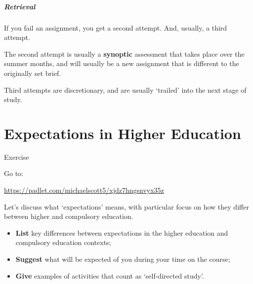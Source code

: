 \begin{frame}
	\frametitle{Retrieval}
		
	If you fail an assignment, you get a second attempt. And, usually, a third attempt.
	
		\vspace{1em}
	
	The second attempt is usually a \textbf{synoptic} assessment that takes place over the summer months, and will usually be a new assignment that is different to the originally set brief.
	
		\vspace{1em}
	
	Third attempts are discretionary, and are usually `trailed' into the next stage of study.
	
\end{frame}

\part{Expectations in Higher Education}
\frame{\partpage}

\begin{frame}{Exercise}

    Go to:
    
    \vspace{0.5em}
    
    \small{\url{https://padlet.com/michaelscott5/xjdz7hngsnvyx35z}}
    
    \vspace{1em}
    
    Let's discuss what `expectations' means, with particular focus on how they differ between higher and compulsory education.
    
    \vspace{0.5em}

	\begin{itemize}
	    \item \textbf{List} key differences between expectations in the higher education and compulsory education contexts;
		\item \textbf{Suggest} what will be expected of you during your time on the course;
		\item 	\textbf{Give} examples of activities that count as `self-directed study'.
	\end{itemize}

\end{frame}

